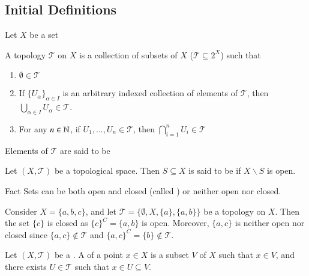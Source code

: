 \documentclass[12pt, a4paper, twoside, openright, titlepage]{book}
\begin{document}
\subsection{Initial Definitions}

Let $X$ be a set

\begin{defn}{}{}
    A topology $\mathcal{T}$ on $X$ is a collection of subsets of $X$ ($\mathcal{T} \subseteq 2^X$) such that \begin{enumerate}
        \item $\emptyset \in \mathcal{T}$
        \item If $\{U_{\alpha}\}_{\alpha \in I}$ is an arbitrary indexed collection of elements of $\mathcal{T}$, then $\bigcup_{\alpha \in I}U_\alpha \in \mathcal{T}$.
        \item For any $n \in \mathbb N$, if $U_1,...,U_n \in \mathcal{T}$, then $\bigcap\limits_{i=1}^nU_i \in \mathcal{T}$
    \end{enumerate}
    Elements of $\mathcal{T}$ are said to be 
\end{defn}

\begin{rmk}{}{}
    Let $(X,\mathcal{T})$ be a topological space. Then $S\subseteq X$ is said to be  if $X\backslash S$ is open. 
\end{rmk}

\begin{cust*}[separator sign={}]{Fact}{}
    Sets can be both open and closed (called ) or neither open nor closed.
\end{cust*}

\begin{eg}{}{}
    Consider $X = \{a,b,c\}$, and let $\mathcal{T} = \{\emptyset, X, \{a\}, \{a,b\}\}$ be a topology on $X$. Then the set $\{c\}$ is closed as $\{c\}^C = \{a,b\}$ is open. Moreover, $\{a,c\}$ is neither open nor closed since $\{a,c\} \notin \mathcal{T}$ and $\{a,c\}^C = \{b\} \notin \mathcal{T}$.
\end{eg}


\begin{defn}{}{}
    Let $(X,\mathcal{T})$ be a . A  of a point $x \in X$ is a subset $V$ of $X$ such that $x \in V$, and there exists $U \in \mathcal{T}$ such that $x \in U \subseteq V$. 
\end{defn}
\end{document}
